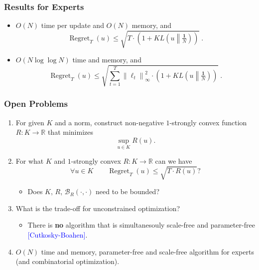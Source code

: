 \documentclass[usenames,dvipsnames]{beamer}
\DeclareMathOperator{\Regret}{Regret}
\newcommand{\R}{\mathbb{R}}
\newcommand{\norm}[1]{\left\|#1\right\|}
\newcommand{\KL}[2]{KL\left({#1}\middle\|{#2}\right)}
\newcommand{\Breg}{\mathcal{B}}
\newcommand{\Cite}[1]{{\tiny \textcolor{Blue}{[#1]}}}
\begin{document}
\begin{frame}
\frametitle{Results for Experts}

\begin{itemize}
\item $O(N)$ time per update and $O(N)$ memory, and
$$
\Regret_T(u) \le \sqrt{T \cdot \left(1 + \KL{u}{\tfrac{\textbf{1}}{N}} \right)} \; .
$$

\item $O(N \log \log N)$ time and memory, and
$$
\Regret_T(u) \le \sqrt{ \sum_{t=1}^T \norm{\ell_t}_\infty^2 \cdot \left(1 + \KL{u}{\tfrac{\textbf{1}}{N}} \right)} \; .
$$
\end{itemize}
\end{frame}

\begin{frame}
\frametitle{Open Problems}

\begin{enumerate}
\item For given $K$ and a norm, construct non-negative $1$-strongly convex
function $R:K \to \R$ that minimizes
$$
\sup_{u \in K} R(u).
$$

\item For what $K$ and $1$-strongly convex $R:K \to \R$ can we have
$$
\forall u \in K \qquad \Regret_T(u) \le \sqrt{T \cdot R(u)} ?
$$

\begin{itemize}
\item Does $K$, $R$, $\Breg_R(\cdot,\cdot)$ need to be bounded?
\end{itemize}

\item What is the trade-off for unconstrained optimization?

\begin{itemize}
\item There is \textbf{no} algorithm that is simultanesouly scale-free
and parameter-free \Cite{Cutkosky-Boahen}.
\end{itemize}

\item $O(N)$ time and memory, parameter-free and scale-free algorithm
for experts (and combinatorial optimization).
\end{enumerate}

\end{frame}
\end{document}
